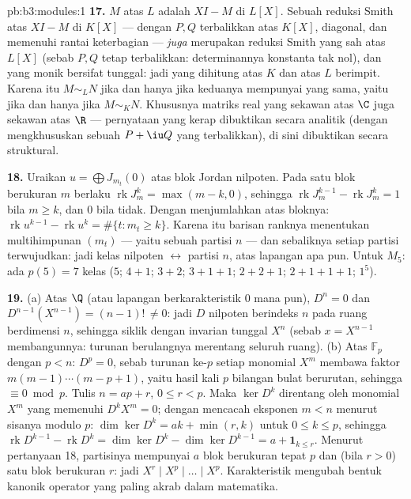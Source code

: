 \begin{solution}{pb:b3:modules:1}
\textbf{17.}  $M$ atas $L$ adalah
 $XI - M$ di $L[X]$. Sebuah reduksi Smith atas
$XI - M$ di $K[X]$ --- dengan $P, Q$ terbalikkan atas $K[X]$,
diagonal, dan memenuhi rantai keterbagian --- \emph{juga} merupakan reduksi
Smith yang sah atas $L[X]$ (sebab $P, Q$ tetap terbalikkan: determinannya
konstanta tak nol), dan  yang monik bersifat tunggal: jadi
 yang dihitung atas $K$ dan atas $L$ berimpit. Karena itu $M \sim_L N$ jika dan hanya jika keduanya mempunyai  yang sama, yaitu jika dan hanya jika $M \sim_K N$. Khususnya
matriks real yang sekawan atas $\C$ juga sekawan atas $\R$ --- pernyataan
yang kerap dibuktikan secara analitik (dengan mengkhususkan sebuah $P + \iu
Q$ yang terbalikkan), di sini dibuktikan secara struktural.

\textbf{18.} Uraikan $u = \bigoplus J_{m_t}(0)$ atas
blok Jordan nilpoten. Pada satu blok berukuran $m$ berlaku
$\operatorname{rk}J_m^k = \max(m - k, 0)$, sehingga
$\operatorname{rk}J_m^{k-1} - \operatorname{rk}J_m^k = 1$ bila $m
\geq k$, dan $0$ bila tidak. Dengan menjumlahkan atas bloknya:
$\operatorname{rk}u^{k-1} - \operatorname{rk}u^k =
\#\{t : m_t \geq k\}$. Karena itu barisan ranknya menentukan
multihimpunan $(m_t)$ --- yaitu sebuah partisi $n$ --- dan sebaliknya
setiap partisi terwujudkan: jadi kelas nilpoten $\leftrightarrow$
partisi $n$, atas lapangan apa pun. Untuk $M_5$: ada $p(5) = 7$ kelas
($5$; $4{+}1$; $3{+}2$; $3{+}1{+}1$; $2{+}2{+}1$;
$2{+}1{+}1{+}1$; $1^5$).

\textbf{19.} (a) Atas $\Q$ (atau lapangan berkarakteristik $0$ mana pun),
$D^n = 0$ dan $D^{n-1}(X^{n-1}) = (n-1)!\, \neq 0$: jadi $D$
nilpoten berindeks $n$ pada ruang berdimensi $n$, sehingga
siklik dengan invarian tunggal $X^n$ (sebab $x = X^{n-1}$ membangunnya:
turunan berulangnya merentang seluruh ruang). (b) Atas $\mathbb F_p$ dengan $p
< n$: $D^p = 0$, sebab turunan ke-$p$ setiap
monomial $X^m$ membawa faktor $m(m-1)\cdots(m-p+1)$, yaitu
hasil kali $p$ bilangan bulat berurutan, sehingga $\equiv 0 \bmod p$.
Tulis $n = ap + r$, $0 \leq r < p$. Maka $\ker D^k$ direntang
oleh monomial $X^m$ yang memenuhi $D^kX^m = 0$; dengan mencacah eksponen
$m < n$ menurut sisanya modulo $p$: $\dim\ker D^k = ak + \min(r,
k)$ untuk $0 \leq k \leq p$, sehingga $\operatorname{rk}D^{k-1} -
\operatorname{rk}D^k = \dim\ker D^k - \dim\ker D^{k-1} = a +
\mathbf 1_{k \leq r}$. Menurut pertanyaan 18, partisinya mempunyai $a$
blok berukuran tepat $p$ dan (bila $r > 0$) satu blok berukuran
$r$: jadi  $X^r \mid X^p \mid \dots \mid X^p$.
Karakteristik mengubah bentuk kanonik operator yang paling akrab
dalam matematika.


\end{solution}
